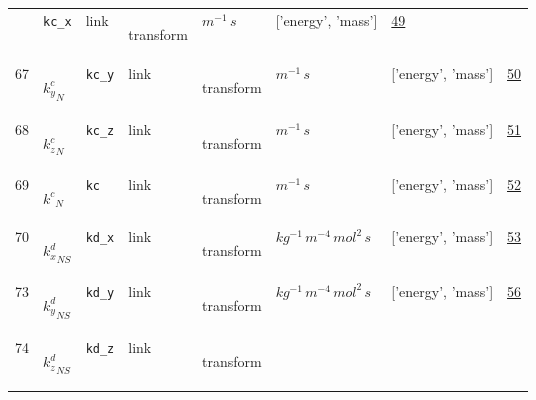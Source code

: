 \begin{longtable}{|p{1cm}|p{3cm}|p{3cm}|p{7cm}|p{3.0cm}|p{3cm}|p{2cm}|p{1cm}|}
             & \verb|kc_x|
             & link
             & \begin{lay}transform \end{lay}
             & $ m^{-1} \,s \, $
             & ['energy', 'mass']
             & \hyperlink{"e:49"}{ 49 }
                 \\
    67
             & \hypertarget{"v:67"}{ $ {k^{c}_{y}}_{N} $}
             & \verb|kc_y|
             & link
             & \begin{lay}transform \end{lay}
             & $ m^{-1} \,s \, $
             & ['energy', 'mass']
             & \hyperlink{"e:50"}{ 50 }
                 \\
    68
             & \hypertarget{"v:68"}{ $ {k^{c}_{z}}_{N} $}
             & \verb|kc_z|
             & link
             & \begin{lay}transform \end{lay}
             & $ m^{-1} \,s \, $
             & ['energy', 'mass']
             & \hyperlink{"e:51"}{ 51 }
                 \\
    69
             & \hypertarget{"v:69"}{ $ {k^{c}}_{N} $}
             & \verb|kc|
             & link
             & \begin{lay}transform \end{lay}
             & $ m^{-1} \,s \, $
             & ['energy', 'mass']
             & \hyperlink{"e:52"}{ 52 }
                 \\
    70
             & \hypertarget{"v:70"}{ $ {k^{d}_{x}}_{{N S}} $}
             & \verb|kd_x|
             & link
             & \begin{lay}transform \end{lay}
             & $ kg^{-1} \,m^{-4} \,mol^{2} \,s \, $
             & ['energy', 'mass']
             & \hyperlink{"e:53"}{ 53 }
                 \\
    73
             & \hypertarget{"v:73"}{ $ {k^{d}_{y}}_{{N S}} $}
             & \verb|kd_y|
             & link
             & \begin{lay}transform \end{lay}
             & $ kg^{-1} \,m^{-4} \,mol^{2} \,s \, $
             & ['energy', 'mass']
             & \hyperlink{"e:56"}{ 56 }
                 \\
    74
             & \hypertarget{"v:74"}{ $ {k^{d}_{z}}_{{N S}} $}
             & \verb|kd_z|
             & link
             & \begin{lay}transform \end{lay}

\end{longtable}

